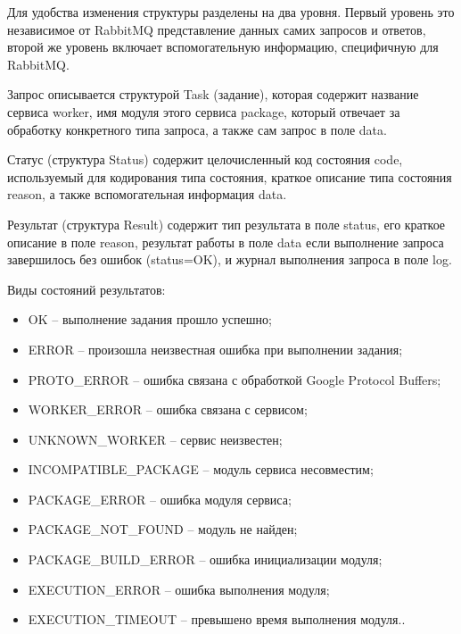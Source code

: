 Для удобства изменения структуры разделены на два уровня. Первый уровень это
независимое от RabbitMQ представление данных самих запросов и ответов,
второй же уровень включает вспомогательную информацию, специфичную для RabbitMQ.

Запрос описывается структурой Task (задание), которая содержит название
сервиса worker, имя модуля этого сервиса package, который отвечает
за обработку конкретного типа запроса, а также сам запрос в поле data.

Статус (структура Status) содержит целочисленный код состояния code,
используемый для кодирования типа состояния, краткое описание типа состояния
reason, а также вспомогательная информация data.

Результат (структура Result) содержит тип результата в поле status,
его краткое описание в поле reason, результат работы в поле data
если выполнение запроса завершилось без ошибок (status=OK), и журнал
выполнения запроса в поле log.

Виды состояний результатов:
\begin{itemize}
    \item OK -- выполнение задания прошло успешно;
    \item ERROR -- произошла неизвестная ошибка при выполнении задания;

    \item PROTO\_ERROR -- ошибка связана с обработкой Google Protocol Buffers;

    \item WORKER\_ERROR -- ошибка связана с сервисом;
    \item UNKNOWN\_WORKER -- сервис неизвестен;
    \item INCOMPATIBLE\_PACKAGE -- модуль сервиса несовместим;

    \item PACKAGE\_ERROR -- ошибка модуля сервиса;
    \item PACKAGE\_NOT\_FOUND -- модуль не найден;
    \item PACKAGE\_BUILD\_ERROR -- ошибка инициализации модуля;

    \item EXECUTION\_ERROR -- ошибка выполнения модуля;
    \item EXECUTION\_TIMEOUT -- превышено время выполнения модуля..
\end{itemize}




